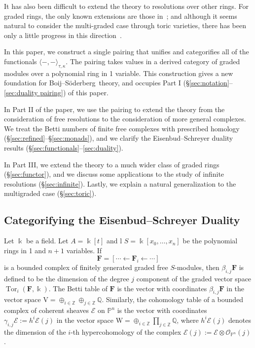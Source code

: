\documentclass[12pt]{amsart}
\theoremstyle{definition}
\theoremstyle{remark}
\newcommand{\Tor}{\operatorname{Tor}}
\newcommand{\kk}{\Bbbk}
\newcommand{\PP}{\mathbb{P}}
\newcommand{\ZZ}{\mathbb{Z}}
\newcommand{\QQ}{\mathbb{Q}}
\newcommand{\VV}{\mathrm{V}}
\newcommand{\WW}{\mathrm{W}}
\newcommand{\cO}{\mathcal{O}}
\newcommand{\cE}{\mathcal{E}}
\newcommand{\FF}{\mathbf{F}}
\newcommand{\defi}[1]{\textsf{#1}} %
\def\BS{Boij--S\"oderberg~}
\begin{document}
It has also been difficult to extend the theory to resolutions over other rings.  For graded rings, the only known extensions are those in~\cite{bbeg}; and although it seems natural to consider the multi-graded case through toric varieties, there has been only a little progress in this direction~\cites{boij-floystad,floystad-multigraded}.

In this paper, we construct a single pairing that unifies and categorifies all of the functionals $\langle-,-\rangle_{\tau,\kappa}$. The pairing takes values in a derived category of graded modules over a polynomial ring in 1 variable.  This construction gives a new foundation for \BS theory, and occupies Part I (\S\ref{sec:notation}--\ref{sec:duality pairing}) of this paper. 

In Part II of the paper, we use the pairing to extend the theory from the consideration of free resolutions to the consideration of more general complexes. We treat the Betti numbers of finite free complexes with prescribed homology  (\S\ref{sec:refined}--\S\ref{sec:monads}), and we clarify the Eisenbud--Schreyer duality results (\S\ref{sec:functionals}--\ref{sec:duality}).  

In Part III, we extend the theory to a much wider class of graded rings (\S\ref{sec:functor}), and we discuss some applications to the study of infinite resolutions (\S\ref{sec:infinite}).  Lastly, we explain a natural generalization to the multigraded case (\S\ref{sec:toric}).

\subsection*{Categorifying the Eisenbud--Schreyer Duality}
Let $\kk$ be a field. Let $A= \kk[t]$ and l $S=\kk[x_0, \dots, x_n]$ be the polynomial rings in 1 and $n+1$ variables. If 
$$
\FF= [\cdots \gets \FF_i \gets \cdots ]
$$
is a bounded complex of finitely generated graded free $S$-modules, then $\beta_{i,j}\FF$ is defined to be the dimension of the degree $j$ component of the graded vector space $\Tor_i(\FF,\kk)$.  The \defi{Betti table} of $\FF$ is the vector with coordinates $\beta_{i,j}\FF$ in the vector space $\VV = \oplus_{i\in \ZZ} \oplus_{j\in \ZZ}\QQ$. Similarly, the \defi{cohomology table} of a bounded complex of coherent sheaves $\cE$ on $\PP^{n}$ is the vector with coordinates $\gamma_{i,j}\cE := h^{i}\cE(j)$ in the vector space $\WW = \oplus_{i\in \ZZ}\prod_{j\in \ZZ}\QQ$, where $h^{i}\cE(j)$ denotes the dimension of the $i$-th hypercohomology of the complex $\cE(j) := \cE \otimes \cO_{\PP^{n}}(j)$. 
\end{document}
